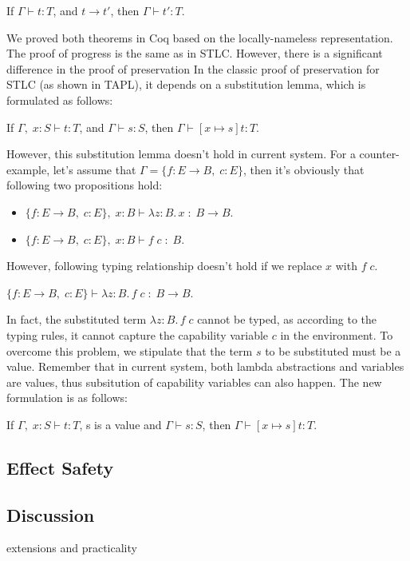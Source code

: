 \begin{theorem}[Preservation]
If $\Gamma \vdash t : T$, and $t \longrightarrow t'$, then $\Gamma
\vdash t' : T$.
\end{theorem}

We proved both theorems in Coq based on the locally-nameless
representation. The proof of progress is the same as in STLC. However,
there is a significant difference in the proof of preservation In the
classic proof of preservation for STLC (as shown in TAPL), it depends
on a substitution lemma, which is formulated as follows:

\begin{lemma}
If $\Gamma,\; x:S \vdash t : T$, and $\Gamma \vdash s : S$, then $\Gamma
\vdash [x \mapsto s]t : T$.
\end{lemma}

However, this substitution lemma doesn't hold in current system. For a
counter-example, let's assume that $\Gamma = \{f: E \to B,\;
  c:E\}$, then it's obviously that following two propositions hold:

\begin{itemize}
\item $\{f: E \to B,\; c:E\},\; x:B \vdash \lambda z:B.\,x \; : \; B \to B$.
\item $\{f: E \to B,\; c:E\},\; x:B \vdash f \; c \; : \; B$.
\end{itemize}

However, following typing relationship doesn't hold if we replace
$x$ with $f \; c$.

\begin{center}
$\{f: E \to B,\; c:E\} \vdash \lambda z:B.\,f \; c \; : \; B \to B$.
\end{center}

In fact, the substituted term $\lambda z:B.\,f \; c$ cannot be typed,
as according to the typing rules, it cannot capture the capability
variable $c$ in the environment. To overcome this problem, we
stipulate that the term $s$ to be substituted must be a
value. Remember that in current system, both lambda abstractions and
variables are values, thus subsitution of capability variables can
also happen. The new formulation is as follows:

\begin{lemma}
  If $\Gamma,\; x:S \vdash t : T$, s is a value and
  $\Gamma \vdash s : S$, then $\Gamma \vdash [x \mapsto s]t : T$.
\end{lemma}

\subsection{Effect Safety}



\subsection{Discussion}

extensions and practicality
